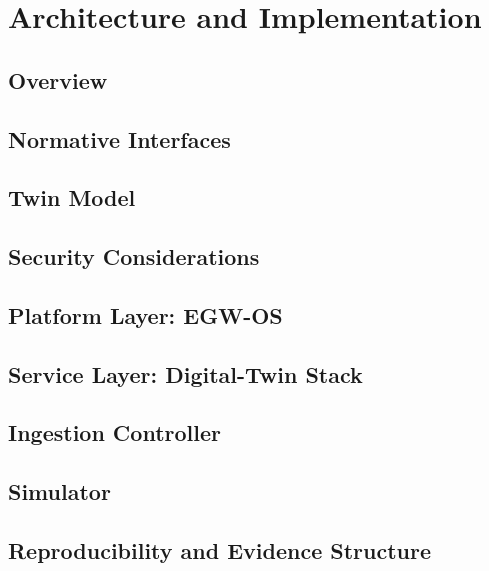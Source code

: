 \chapter{Architecture and Implementation}
\label{ch:architecture}

\section{Overview}

\section{Normative Interfaces}

\section{Twin Model}

\section{Security Considerations}

\section{Platform Layer: EGW-OS}

\section{Service Layer: Digital-Twin Stack}

\section{Ingestion Controller}

\section{Simulator}

\section{Reproducibility and Evidence Structure}
